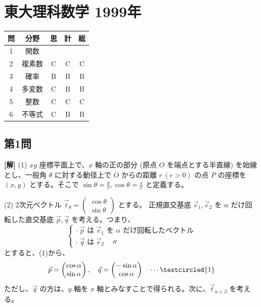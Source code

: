 \documentclass[../main.tex]{subfiles}
\begin{document}
\section*{東大理科数学 1999年}

\begin{center}
  \begin{tabular}{|c|c|c|c|c|}
    \hline
    問 & 分野 & 思 & 計 & 総 \\ \hline
    1 & 関数 & & & \\ \hline
    2 & 複素数 & C & C & C \\ \hline
    3 & 確率 & B & B & B \\ \hline
    4 & 多変数 & C & B & B \\ \hline
    5 & 整数 & C & C & C \\ \hline
    6 & 不等式 & C & B & B \\ \hline
  \end{tabular}
\end{center}

\bigskip

\subsection*{第1問}

\noindent
\textbf{[解]} (1) $xy$ 座標平面上で、$x$ 軸の正の部分 (原点 $O$ を端点とする半直線) を始線とし、一般角 $\theta$ に対する動径上で $O$ からの距離 $r\, (r>0)$ の点 $P$ の座標を $(x,y)$ とする。そこで $\sin\theta = \frac{y}{r}, \cos\theta = \frac{x}{r}$ と定義する。

\bigskip

\noindent
(2) 2次元ベクトル $\vec{t}_\theta =
\begin{pmatrix} \cos\theta \\ \sin\theta
\end{pmatrix}$ とする。
正規直交基底 $\vec{e}_1, \vec{e}_2$ を $\alpha$ だけ回転した直交基底 $\vec{p}, \vec{q}$ を考える。つまり、
\[
  \begin{cases}
    \cdot \; \vec{p} \text{ は } \vec{e}_1 \text{ を } \alpha \text{ だけ回転したベクトル} \\
    \cdot \; \vec{q} \text{ は } \vec{e}_2 \quad \text{〃}
  \end{cases}
\]
とすると、(1)から、
\[
  \vec{p} =
  \begin{pmatrix} \cos\alpha \\ \sin\alpha
  \end{pmatrix}, \quad \vec{q} =
  \begin{pmatrix} -\sin\alpha \\ \cos\alpha
  \end{pmatrix} \quad \cdots \textcircled{1}
\]
ただし、$\vec{q}$ の方は、$y$ 軸を $x$ 軸とみなすことで得られる。次に、$\vec{t}_{\alpha+\beta}$ を考える。
\end{document}
